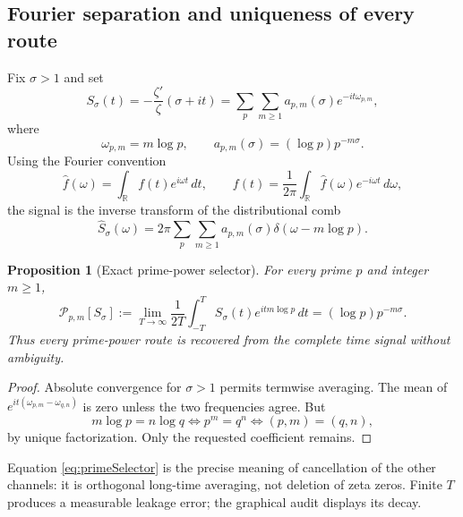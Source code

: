 \documentclass[11pt]{amsart}
\newtheorem{proposition}[theorem]{Proposition}
\theoremstyle{definition}
\theoremstyle{remark}
\begin{document}
\subsection{Fourier separation and uniqueness of every route}
Fix $\sigma>1$ and set
\begin{equation}\label{eq:primeTimeSignal}
 S_\sigma(t)=-\frac{\zeta'}{\zeta}(\sigma+it)
 =\sum_p\sum_{m\ge1}a_{p,m}(\sigma)e^{-it\omega_{p,m}},
\end{equation}
where
\begin{equation}\label{eq:primeChannelData}
 \omega_{p,m}=m\log p,
 \qquad
 a_{p,m}(\sigma)=(\log p)p^{-m\sigma}.
\end{equation}
Using the Fourier convention
\begin{equation}\label{eq:fourierConvention}
 \widehat f(\omega)=\int_{\mathbb R}f(t)e^{i\omega t}\,dt,
 \qquad
 f(t)=\frac1{2\pi}\int_{\mathbb R}\widehat f(\omega)e^{-i\omega t}\,d\omega,
\end{equation}
the signal is the inverse transform of the distributional comb
\begin{equation}\label{eq:primeFourierComb}
 \widehat S_\sigma(\omega)
 =2\pi\sum_p\sum_{m\ge1}a_{p,m}(\sigma)
 \delta(\omega-m\log p).
\end{equation}

\begin{proposition}[Exact prime-power selector]\label{prop:exact-prime-selector}
For every prime $p$ and integer $m\ge1$,
\begin{equation}\label{eq:primeSelector}
 \mathcal P_{p,m}[S_\sigma]
 :=\lim_{T\to\infty}\frac1{2T}\int_{-T}^{T}
 S_\sigma(t)e^{it m\log p}\,dt
 =(\log p)p^{-m\sigma}.
\end{equation}
Thus every prime-power route is recovered from the complete time signal without ambiguity.
\end{proposition}

\begin{proof}
Absolute convergence for $\sigma>1$ permits termwise averaging.  The mean of
$e^{it(\omega_{p,m}-\omega_{q,n})}$ is zero unless the two frequencies agree.  But
\begin{equation}\label{eq:primeFrequencyUniqueness}
 m\log p=n\log q
 \iff p^m=q^n
 \iff (p,m)=(q,n),
\end{equation}
by unique factorization.  Only the requested coefficient remains.
\end{proof}

Equation \eqref{eq:primeSelector} is the precise meaning of cancellation of the other
channels: it is orthogonal long-time averaging, not deletion of zeta zeros.  Finite $T$
produces a measurable leakage error; the graphical audit displays its decay.
\end{document}
